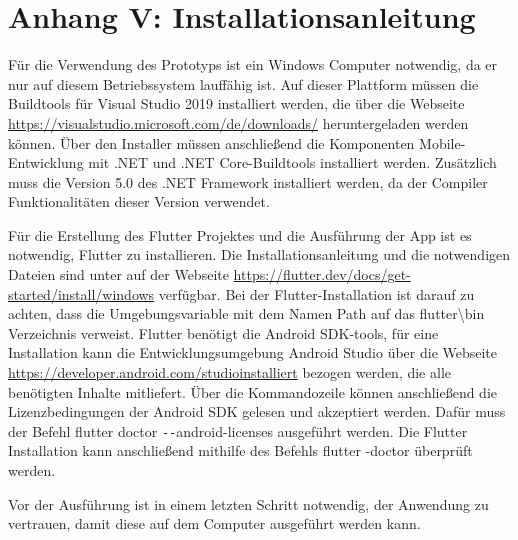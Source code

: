 \chapter{Anhang V: Installationsanleitung}
\label{chap:Installationsanleitung}

Für die Verwendung des Prototyps ist ein Windows Computer notwendig,  da er nur auf diesem Betriebssystem lauffähig ist.  Auf dieser Plattform müssen die Buildtools für Visual Studio 2019 installiert werden, die über die Webseite \url{https://visualstudio.microsoft.com/de/downloads/} heruntergeladen werden können.  Über den Installer müssen anschließend die Komponenten \glqq Mobile-Entwicklung mit .NET\grqq{} und \glqq .NET Core-Buildtools\grqq{} installiert werden.  Zusätzlich muss die Version 5.0 des .NET Framework installiert werden,   da der Compiler Funktionalitäten dieser Version verwendet.  

Für die Erstellung des Flutter Projektes und die Ausführung der App ist es notwendig,  Flutter zu installieren.  Die Installationsanleitung und die notwendigen Dateien sind unter auf der Webseite \url{https://flutter.dev/docs/get-started/install/windows} verfügbar.  
Bei der Flutter-Installation ist darauf zu achten,  dass die Umgebungsvariable mit dem Namen \glq Path\grq{}  auf das \glqq flutter\textbackslash bin\grqq{} Verzeichnis verweist. 
Flutter benötigt die Android SDK-tools,  für eine Installation kann die Entwicklungsumgebung Android Studio über die Webseite \url{https://developer.android.com/studioinstalliert} bezogen werden,  die alle benötigten Inhalte mitliefert. 
Über die Kommandozeile können anschließend die Lizenzbedingungen der Android SDK gelesen und akzeptiert werden.  Dafür muss der Befehl \glqq flutter doctor \texttt{-{}-}android-licenses\grqq{} ausgeführt werden.  Die Flutter Installation kann anschließend mithilfe des  Befehls \glqq flutter -doctor\grqq{} überprüft werden.

Vor der Ausführung ist in einem letzten Schritt notwendig,  der Anwendung zu vertrauen,  damit diese auf dem Computer ausgeführt werden kann.